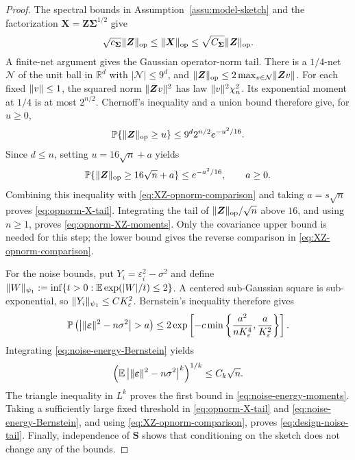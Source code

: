 \documentclass{article}
\theoremstyle{plain}
\theoremstyle{definition}
\theoremstyle{definition}
\DeclarePairedDelimiter\norm{\lVert}{\rVert}
\def\R{{\mathbb{R}}}
\def\E{{\mathbb{E}}}
\def\P{{\mathbb{P}}}
\def\mathbold{\boldsymbol}
\def\bS{\mathbold{S}}\def\hbS{{\widehat{\bS}}}\def\tbS{{\widetilde{\bS}}}
\def\bX{\mathbold{X}}\def\hbX{{\widehat{\bX}}}\def\tbX{{\tilde{\bX}}}\def\bXbar{{\overline \bX}}
\def\bZ{\mathbold{Z}}\def\hbZ{{\widehat{\bZ}}}\def\tbZ{{\widetilde{\bZ}}}
\def\ep{\varepsilon}\def\eps{\epsilon}\def\veps{\varepsilon}
\def\bep{ {\mathbold{\ep} }}
\def\bSigma{\mathbold{\Sigma}}\def\hbSigma{{\widehat{\bSigma}}}
\begin{document}
\begin{proof}
The spectral bounds in Assumption~\ref{assu:model-sketch} and the
factorization $\bX=\bZ\bSigma^{1/2}$ give
\begin{align}
    \sqrt{c_{\bSigma}}\norm{\bZ}_{\rm op}
    \leq \norm{\bX}_{\rm op}
    \leq \sqrt{C_{\bSigma}}\norm{\bZ}_{\rm op}.
    \label{eq:XZ-opnorm-comparison}
\end{align}
A finite-net argument gives the Gaussian
operator-norm tail. There is a $1/4$-net $\mathcal N$ of the unit ball in
$\R^d$ with $|\mathcal N|\leq9^d$, and
$\norm{\bZ}_{\rm op}\leq2\max_{v\in\mathcal N}\norm{\bZ v}$.
For each fixed $\norm v\leq1$, the squared norm $\norm{\bZ v}^2$ has law
$\norm v^2\chi_n^2$. Its exponential moment at $1/4$ is at most $2^{n/2}$.
Chernoff's inequality and a union bound therefore give, for $u\geq0$,
\begin{align*}
    \P\{\norm{\bZ}_{\rm op}\geq u\}
       \leq9^d2^{n/2}e^{-u^2/16}.
\end{align*}
Since $d\leq n$, setting $u=16\sqrt n+a$ yields
\begin{align*}
    \P\{\norm{\bZ}_{\rm op}\geq16\sqrt n+a\}
       \leq e^{-a^2/16},\qquad a\geq0.
\end{align*}
Combining this inequality with \eqref{eq:XZ-opnorm-comparison} and taking
$a=s\sqrt n$ proves \eqref{eq:opnorm-X-tail}. Integrating the tail of
$\norm{\bZ}_{\rm op}/\sqrt n$ above $16$, and using $n\geq1$, proves
\eqref{eq:opnorm-XZ-moments}. Only the covariance upper bound is needed
for this step; the lower bound gives the reverse comparison in
\eqref{eq:XZ-opnorm-comparison}.

For the noise bounds, put $Y_i=\varepsilon_i^2-\sigma^2$ and define
$\norm{W}_{\psi_1}:=\inf\{t>0:\E\exp(|W|/t)\leq2\}$.
A centered sub-Gaussian square is
sub-exponential, so $\norm{Y_i}_{\psi_1}\leq C K_\varepsilon^2$.
Bernstein's inequality therefore gives
\begin{align}
    \P\left(
       \left|\norm{\bep}^2-n\sigma^2\right|>a
    \right)
    \leq
    2\exp\left[
       -c\min\left\{
          \frac{a^2}{nK_\varepsilon^4},
          \frac{a}{K_\varepsilon^2}
       \right\}
    \right].
    \label{eq:noise-energy-Bernstein}
\end{align}
Integrating \eqref{eq:noise-energy-Bernstein} yields
\begin{align*}
    \left(
       \E\left|\norm{\bep}^2-n\sigma^2\right|^k
    \right)^{1/k}
    \leq C_k\sqrt n.
\end{align*}
The triangle inequality in $L^k$ proves the first bound in
\eqref{eq:noise-energy-moments}.  Taking a sufficiently large fixed threshold
in \eqref{eq:opnorm-X-tail} and \eqref{eq:noise-energy-Bernstein}, and using
\eqref{eq:XZ-opnorm-comparison}, proves \eqref{eq:design-noise-tail}.
Finally, independence of $\bS$ shows that conditioning on the sketch does not
change any of the bounds.
\end{proof}
\end{document}
